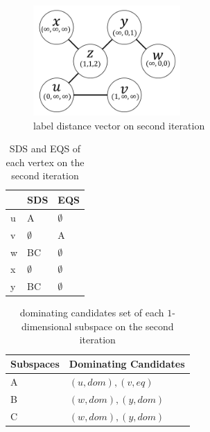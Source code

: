 \begin{figure}[H]
    \centering
    \includegraphics[width=0.5\textwidth]{figs/graph_example_2}
    \caption{\label{font-figure}label distance vector on second iteration}
    \label{fig:cand_step2}
\end{figure}

\begin{table}[H]
    \centering
    \begin{tabular}{|l|l|l|}
    \hline
      & SDS         & EQS         \\ \hline
    u & A           & $\emptyset$ \\ \hline
    v & $\emptyset$ & A           \\ \hline
    w & BC          & $\emptyset$ \\ \hline
    x & $\emptyset$ & $\emptyset$ \\ \hline
    y & BC          & $\emptyset$ \\ \hline
    \end{tabular}
    \caption{\label{font-table}SDS and EQS of each vertex on the second iteration}
    \label{tab:sds_step2}
\end{table}

\begin{table}[H]
    \centering

    \begin{tabular}{|l|l|}
    \hline
    Subspaces & Dominating Candidates \\ \hline
    A         & $(u, dom), (v, eq)$            \\ \hline
    B         & $(w, dom), (y, dom)$            \\ \hline
    C         & $(w, dom), (y, dom)$            \\ \hline
    \end{tabular}
    \caption{\label{font-table}dominating candidates set of each $1$-dimensional subspace on the second iteration}
    \label{tab:cand_set_step2}
\end{table}


